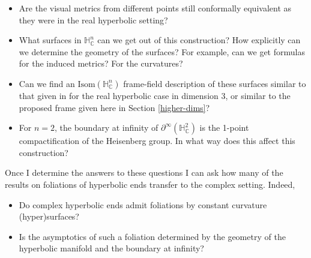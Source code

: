 \documentclass[11pt]{amsart}
\newcommand{\C}{\mathbb{C}}
\renewcommand{\H}{\mathbb{H}}
\begin{document}
\begin{itemize}

\item Are the visual metrics from different points still conformally equivalent as they were in the real hyperbolic setting?

\item What surfaces in $\H_{\C}^n$ can we get out of this construction? How explicitly can we determine the geometry of the surfaces? For example, can we get formulas for the induced metrics? For the curvatures?

\item Can we find an $\mathrm{Isom}(\H_{\C}^n)$ frame-field description of these surfaces similar to that given in \cite{dumas2017} for the real hyperbolic case in dimension 3, or similar to the proposed frame given here in Section \ref{higher-dims}?

\item For $n=2$, the boundary at infinity of $\partial^\infty (\H_{\C}^2)$ is the 1-point compactification of the Heisenberg group. In what way does this affect this construction?

\end{itemize}
Once I determine the answers to these questions I can ask how many of the results on foliations of hyperbolic ends transfer to the complex setting. Indeed,
\begin{itemize}

\item Do complex hyperbolic ends admit foliations by constant curvature (hyper)surfaces?

\item Is the asymptotics of such a foliation determined by the geometry of the hyperbolic manifold and the boundary at infinity?

\end{itemize}






\end{document}
